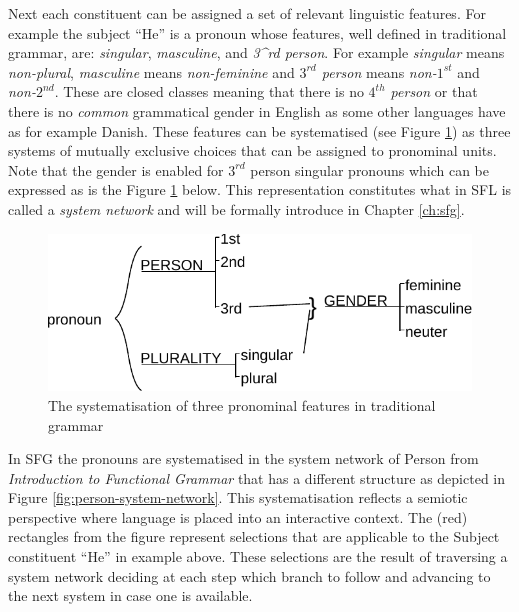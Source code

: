 Next each constituent can be assigned a set of relevant linguistic features. For example the subject ``He'' is a pronoun whose features, well defined in traditional grammar, are: \textit{singular}, \textit{masculine}, and \textit{3^{rd} person}. %
For example \textit{singular} means \textit{non-plural}, \textit{masculine} means \textit{non-feminine} and \textit{$3^{rd}$ person} means \textit{non-$1^{st}$} and \textit{non-$2^{nd}$}. These are closed classes meaning that there is no \textit{$4^{th}$ person} or that there is no \textit{common} grammatical gender in English as some other languages have as for example Danish. These features can be systematised (see Figure \ref{fig:traditional-pronoun}) as three systems of mutually exclusive choices that can be assigned to pronominal units. Note that the gender is enabled for $3^{rd}$ person singular pronouns which can be expressed as is the Figure \ref{fig:traditional-pronoun} below. This representation constitutes what in SFL is called a \textit{system network} and will be formally introduce in Chapter \ref{ch:sfg}.

\begin{figure}[!ht]
    \centering      
    \includegraphics[width=.56\textwidth]{Figures/Example/traditional-pronoun.pdf}
    \caption{The systematisation of three pronominal features in traditional grammar}
    \label{fig:traditional-pronoun}
\end{figure}

In SFG the pronouns are systematised in the system network of Person from \textit{Introduction to Functional Grammar} \citep[366]{Halliday2013} that has a different structure as depicted in Figure \ref{fig:person-system-network}. This systematisation reflects a semiotic perspective where language is placed into an interactive context. The (red) rectangles from the figure represent selections that are applicable to the Subject constituent ``He'' in example above. These selections are the result of traversing a system network deciding at each step which branch to follow and advancing to the next system in case one is available. 

